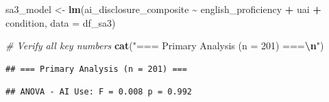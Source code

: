 \documentclass[
]{article}
\newenvironment{Shaded}{\begin{snugshade}}{\end{snugshade}}
\newcommand{\AttributeTok}[1]{\textcolor[rgb]{0.13,0.29,0.53}{#1}}
\newcommand{\CommentTok}[1]{\textcolor[rgb]{0.56,0.35,0.01}{\textit{#1}}}
\newcommand{\DecValTok}[1]{\textcolor[rgb]{0.00,0.00,0.81}{#1}}
\newcommand{\FunctionTok}[1]{\textcolor[rgb]{0.13,0.29,0.53}{\textbf{#1}}}
\newcommand{\NormalTok}[1]{#1}
\newcommand{\OtherTok}[1]{\textcolor[rgb]{0.56,0.35,0.01}{#1}}
\newcommand{\SpecialCharTok}[1]{\textcolor[rgb]{0.81,0.36,0.00}{\textbf{#1}}}
\newcommand{\StringTok}[1]{\textcolor[rgb]{0.31,0.60,0.02}{#1}}
\begin{document}
\begin{Shaded}
\begin{Highlighting}[]
\NormalTok{sa3\_model }\OtherTok{\textless{}{-}} \FunctionTok{lm}\NormalTok{(ai\_disclosure\_composite }\SpecialCharTok{\textasciitilde{}}\NormalTok{ english\_proficiency }\SpecialCharTok{+}\NormalTok{ uai }\SpecialCharTok{+}\NormalTok{ condition,}
                \AttributeTok{data =}\NormalTok{ df\_sa3)}

\CommentTok{\# Verify all key numbers}
\FunctionTok{cat}\NormalTok{(}\StringTok{"=== Primary Analysis (n = 201) ===}\SpecialCharTok{\textbackslash{}n}\StringTok{"}\NormalTok{)}
\end{Highlighting}
\end{Shaded}

\begin{verbatim}
## === Primary Analysis (n = 201) ===
\end{verbatim}

\begin{Shaded}
\end{Shaded}

\begin{verbatim}
## ANOVA - AI Use: F = 0.008 p = 0.992
\end{verbatim}

\begin{Shaded}
\end{Shaded}
\end{document}
